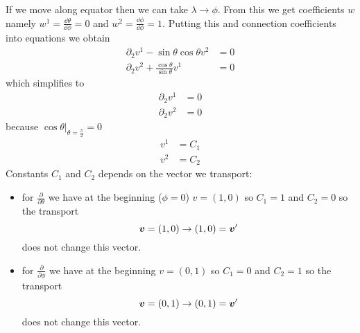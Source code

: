 %
If we move along equator then we can take $\lambda \rightarrow \phi$. From
this we get coefficients $w$ namely $w^1 = \frac{\dd \theta}{\dd \phi} = 0$
and $w^2 = \frac{\dd \phi}{\dd \phi} = 1$. Putting this and connection
coefficients into equations we obtain
%
\begin{subequations}
    \begin{align}
        \partial_2 v^1 - \sin\theta\cos\theta v^2          & = 0 \\
        \partial_2 v^2 + \frac{\cos\theta}{\sin\theta} v^1 & = 0
    \end{align}
\end{subequations}
%
which simplifies to
%
\begin{subequations}
    \begin{align}
        \partial_2 v^1 & = 0 \\
        \partial_2 v^2 & = 0
    \end{align}
\end{subequations}
%
because $\cos\theta \Big|_{\theta=\frac{\pi}{2}}= 0$
%
\begin{subequations}
    \begin{align}
        v^1 & = C_1 \\
        v^2 & = C_2
    \end{align}
\end{subequations}
%
Constants $C_1$ and $C_2$ depends on the vector we transport:
\begin{itemize}
    \item for $\frac{\partial}{\partial \theta}$ we have at the beginning
          ($\phi = 0$) $v=(1,0)$ so $C_1 = 1$ and $C_2 = 0$ so the
          transport
          \begin{equation}
              \boldsymbol{v} = (1,0) \rightarrow (1,0) = \boldsymbol{v}'
          \end{equation}
          does not change this vector.
    \item for $\frac{\partial}{\partial \phi}$ we have at the beginning
          $v=(0,1)$ so $C_1 = 0$ and $C_2 = 1$ so the transport
          \begin{equation}
              \boldsymbol{v} = (0,1) \rightarrow (0,1) = \boldsymbol{v}'
          \end{equation}
          does not change this vector.
\end{itemize}

